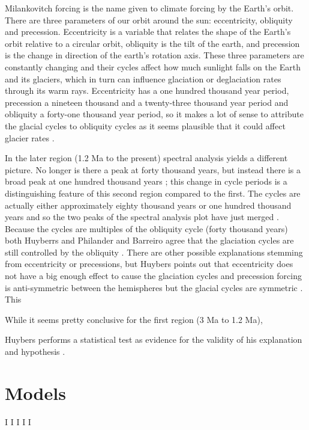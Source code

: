 \documentclass[11pt]{article}
\begin{document}
Milankovitch forcing is the name given to climate forcing by the Earth's orbit.
There are three parameters of our orbit around the sun: eccentricity, obliquity and precession.
Eccentricity is a variable that relates the shape of the Earth's orbit relative to a circular orbit, obliquity is the tilt of the earth, and precession is the change in direction of the earth's rotation axis.
These three parameters are constantly changing and their cycles affect how much sunlight falls on the Earth and its glaciers, which in turn can influence glaciation or deglaciation rates through its warm rays.
Eccentricity has a one hundred thousand year period, precession a nineteen thousand and a twenty-three thousand year period and obliquity a forty-one thousand year period, so it makes a lot of sense to attribute the glacial cycles to obliquity cycles as it seems plausible that it could affect glacier rates \cite{uri}.

In the later region (1.2 Ma to the present) spectral analysis yields a different picture.
No longer is there a peak at forty thousand years, but instead there is a broad peak at one hundred thousand years \cite{huybers}; this change in cycle periods is a distinguishing feature of this second region compared to the first.
The cycles are actually either approximately eighty thousand years or one hundred thousand years and so the two peaks of the spectral analysis plot have just merged \cite{philander}.
Because the cycles are multiples of the obliquity cycle (forty thousand years) both Huyberrs and Philander and Barreiro agree that the glaciation cycles are still controlled by the obliquity \cite{hyubers}\cite{philander}.
There are other possible explanations stemming from eccentricity or precessions, but Huybers points out that eccentricity does not have a big enough effect to cause the glaciation cycles and precession forcing is anti-symmetric between the hemispheres but the glacial cycles are symmetric \cite{hyubers}.
This 

While it seems pretty conclusive for the first region (3 Ma to 1.2 Ma), 

Huybers performs a statistical test as evidence for the validity of his explanation and hypothesis \cite{huybers}.




\section{Models}




\begin{thebibliography}{9}
		I
		I
        I
		I%
        I%
\end{thebibliography}
\end{document}
